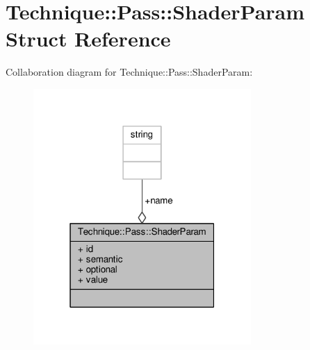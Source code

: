 \hypertarget{structTechnique_1_1Pass_1_1ShaderParam}{}\section{Technique\+:\+:Pass\+:\+:Shader\+Param Struct Reference}
\label{structTechnique_1_1Pass_1_1ShaderParam}


Collaboration diagram for Technique\+:\+:Pass\+:\+:Shader\+Param\+:
\nopagebreak
\begin{figure}[H]
\begin{center}
\leavevmode
\includegraphics[width=235pt]{dc/dd8/structTechnique_1_1Pass_1_1ShaderParam__coll__graph}
\end{center}
\end{figure}
